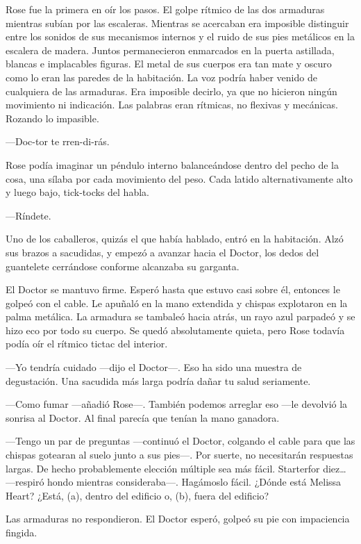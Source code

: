 {Rose fue la primera en oír los pasos. El golpe rítmico de las dos
	armaduras mientras subían por las escaleras. Mientras se acercaban era
	imposible distinguir entre los sonidos de sus mecanismos internos y el
	ruido de sus pies metálicos en la escalera de madera. Juntos
	permanecieron enmarcados en la puerta astillada, blancas e implacables
	figuras. El metal de sus cuerpos era tan mate y oscuro como lo eran las
	paredes de la habitación. La voz podría haber venido de cualquiera de
	las armaduras. Era imposible decirlo, ya que no hicieron ningún
	movimiento ni indicación. Las palabras eran rítmicas, no flexivas y
mecánicas. Rozando lo impasible.}

{---Doc-tor te rren-di-rás.}

{Rose podía imaginar un péndulo interno balanceándose dentro del pecho
	de la cosa, una sílaba por cada movimiento del peso. Cada latido
alternativamente alto y luego bajo, tick-tocks del habla.}

{---Ríndete.}

{Uno de los caballeros, quizás el que había hablado, entró en la
	habitación. Alzó sus brazos a sacudidas, y empezó a avanzar hacia el
	Doctor, los dedos del guantelete cerrándose conforme alcanzaba su
garganta.}

{El Doctor se mantuvo firme. Esperó hasta que estuvo casi sobre él,
	entonces le golpeó con el cable. Le apuñaló en la mano extendida y
	chispas explotaron en la palma metálica. La armadura se tambaleó hacia
	atrás, un rayo azul parpadeó y se hizo eco por todo su cuerpo. Se quedó
	absolutamente quieta, pero Rose todavía podía oír el rítmico tictac del
interior.}

{---Yo tendría cuidado ---dijo el Doctor---. Eso ha sido una muestra de
degustación. Una sacudida más larga podría dañar tu salud seriamente.}

{---Como fumar ---añadió Rose---. También podemos arreglar eso ---le
	devolvió la sonrisa al Doctor. Al final parecía que tenían la mano
ganadora.}

{---Tengo un par de preguntas ---continuó el Doctor, colgando el cable
	para que las chispas gotearan al suelo junto a sus pies---. Por suerte,
	no necesitarán respuestas largas. De hecho probablemente elección
	múltiple sea más fácil. Starterfor diez\ldots{} ---respiró hondo
	mientras consideraba---. Hagámoslo fácil. ¿Dónde está Melissa Heart?
¿Está, (a), dentro del edificio o, (b), fuera del edificio?}

{Las armaduras no respondieron. El Doctor esperó, golpeó su pie con
impaciencia fingida. }

